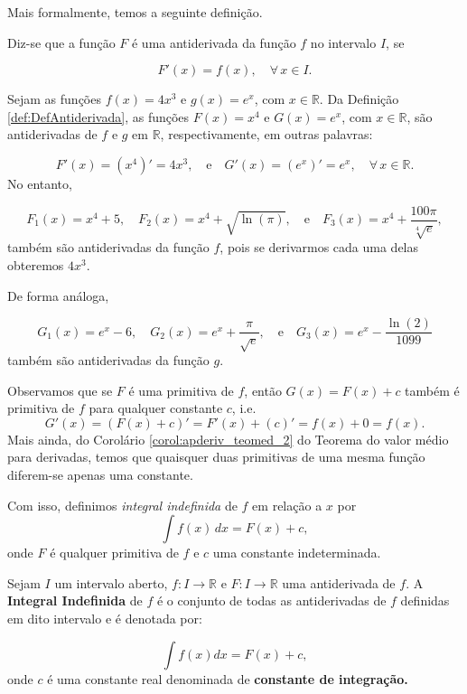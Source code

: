 \cleardoublepage\documentclass[../main.tex]{subfiles}
\begin{document}
Mais formalmente, temos a seguinte definição.

\begin{framed}
\begin{definition}\label{def:DefAntiderivada}
Diz-se que a função \(F\) é uma antiderivada da função \(f\) no intervalo \(I\), se

\[ F'(x)=f(x), \quad \forall\,x\in I. \]
\end{definition}
\end{framed}

\begin{ex}
Sejam as funções \(f(x)=4x^3\) e \(g(x)=e^{x}\), com \(x\in \mathbb{R}\). Da Definição \ref{def:DefAntiderivada}, as funções \(F(x)=x^4\) e \(G(x)=e^x\), com \(x\in \mathbb{R}\), são antiderivadas de \(f\) e \(g\) em \(\mathbb{R}\), respectivamente, em outras palavras:

\[ F'(x)=\left(x^4\right)'=4x^3,\quad \mbox{e}\quad G'(x)=(e^x)'=e^x,\quad \forall\,x\in \mathbb{R}. \]
No entanto,

\[ F_1(x)=x^4+5,\quad F_2(x)=x^4+\sqrt{\ln (\pi)},\quad\mbox{e}\quad F_3(x)=x^4+\dfrac{100\pi}{\sqrt[4]{e}}, \]
também são antiderivadas da função \(f\), pois se derivarmos cada uma delas obteremos \(4x^3\).

De forma análoga,

\[ G_1(x)=e^x-6,\quad G_2(x)=e^x+ \dfrac{\pi}{\sqrt{e}},\quad\mbox{e}\quad G_3(x)=e^x-\dfrac{\ln (2)}{1099} \]
também são antiderivadas da função \(g\).
\end{ex}

Observamos que se $F$ é uma primitiva de $f$, então $G(x) = F(x) + c$ também é primitiva de $f$ para qualquer constante $c$, i.e.
\begin{equation}
  G'(x) = (F(x) + c)' = F'(x) + (c)' = f(x) + 0 = f(x).
\end{equation}
Mais ainda, do Corolário \ref{corol:apderiv_teomed_2} do Teorema do valor médio para derivadas, temos que quaisquer duas primitivas de uma mesma função diferem-se apenas uma constante.

Com isso, definimos \emph{integral indefinida} de $f$ em relação a $x$ por
\begin{equation}
  \int f(x)\,dx = F(x) + c,\label{eq:DefIntIndef}
\end{equation}
onde $F$ é qualquer primitiva de $f$ e $c$ uma constante indeterminada.

\begin{framed}
\begin{definition}\label{def:DefGeralAntiDerivada}
Sejam \(I\) um intervalo aberto, \(f:I \to \mathbb{R}\) e \(F:I \to \mathbb{R}\) uma antiderivada de \(f\). A \textbf{Integral Indefinida} de \(f\) é o conjunto de todas as antiderivadas de \(f\) definidas em dito intervalo e é denotada por:

\[ \int f(x)dx=F(x)+ c, \]
onde \(c\) é uma constante real denominada de \textbf{constante de integração.}
\end{definition}
\end{framed}
\end{document}

